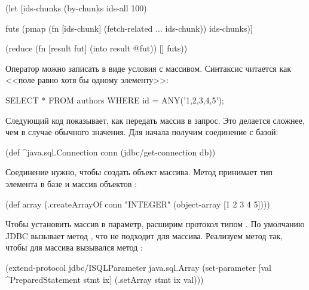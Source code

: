 \begin{english}
  \begin{clojure/lines}
(let [ids-chunks
      (by-chunks ids-all 100)

      futs
      (pmap (fn [ids-chunk]
              (fetch-related ... ids-chunk))
            ids-chunks)]

  (reduce
   (fn [result fut]
     (into result @fut))
   []
   futs))
  \end{clojure/lines}
\end{english}

Оператор  можно записать в виде условия  с массивом. Синтаксис читается как <<поле  равно хотя бы одному элементу>>:

\begin{english}
  \begin{sql}
SELECT * FROM authors WHERE id = ANY('{1,2,3,4,5}');
  \end{sql}
\end{english}

Следующий код показывает, как передать массив в запрос. Это делается сложнее, чем в случае обычного значения. Для начала получим соединение с базой:

\begin{english}
  \begin{clojure}
(def ^java.sql.Connection conn
  (jdbc/get-connection db))
  \end{clojure}
\end{english}

Соединение нужно, чтобы создать объект массива. Метод  принимает тип элемента в базе и массив объектов :

\begin{english}
  \begin{clojure}
(def array
  (.createArrayOf conn "INTEGER"
                  (object-array [1 2 3 4 5])))
  \end{clojure}
\end{english}


Чтобы установить массив в параметр, расширим протокол  типом . По умолчанию JDBC вызывает метод , что не подходит для массива. Реализуем метод  так, чтобы для массива вызывался метод :

\begin{english}
  \begin{clojure}
(extend-protocol jdbc/ISQLParameter
  java.sql.Array
  (set-parameter [val ^PreparedStatement stmt ix]
    (.setArray stmt ix val)))
  \end{clojure}
\end{english}

